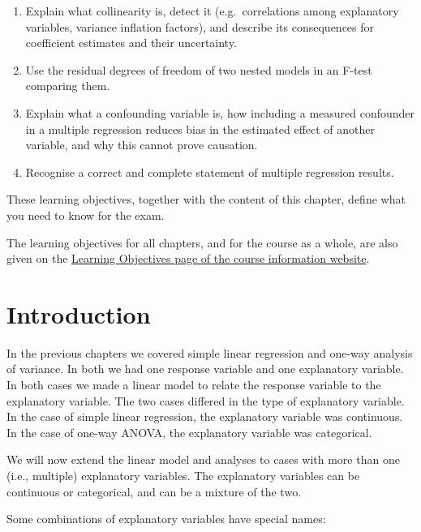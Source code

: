 \documentclass[
  letterpaper,
  8pt,
  a4paper]{book}
\begin{document}
\begin{tcolorbox}
\begin{enumerate}
\item
  Explain what collinearity is, detect it (e.g.~correlations among
  explanatory variables, variance inflation factors), and describe its
  consequences for coefficient estimates and their uncertainty.
\item
  Use the residual degrees of freedom of two nested models in an F-test
  comparing them.
\item
  Explain what a confounding variable is, how including a measured
  confounder in a multiple regression reduces bias in the estimated
  effect of another variable, and why this cannot prove causation.
\item
  Recognise a correct and complete statement of multiple regression
  results.
\end{enumerate}

These learning objectives, together with the content of this chapter,
define what you need to know for the exam.

The learning objectives for all chapters, and for the course as a whole,
are also given on the
\href{https://opetchey.github.io/BIO144_Course_Information/3.1-learning-objectives.html}{Learning
Objectives page of the course information website}.

\end{tcolorbox}

\section*{Introduction}\label{introduction-3}


In the previous chapters we covered simple linear regression and one-way
analysis of variance. In both we had one response variable and one
explanatory variable. In both cases we made a linear model to relate the
response variable to the explanatory variable. The two cases differed in
the type of explanatory variable. In the case of simple linear
regression, the explanatory variable was continuous. In the case of
one-way ANOVA, the explanatory variable was categorical.

We will now extend the linear model and analyses to cases with more than
one (i.e., multiple) explanatory variables. The explanatory variables
can be continuous or categorical, and can be a mixture of the two.

Some combinations of explanatory variables have special names:
\end{document}
